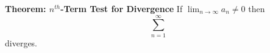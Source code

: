 \nopagenumbers
{\bf Theorem: $n^{th}$-Term Test for Divergence}
\vskip 6pt
If $\lim_{n\to\infty}a_n \neq 0$ then $$\sum_{n=1}^\infty$$ diverges.

\vfill\eject
